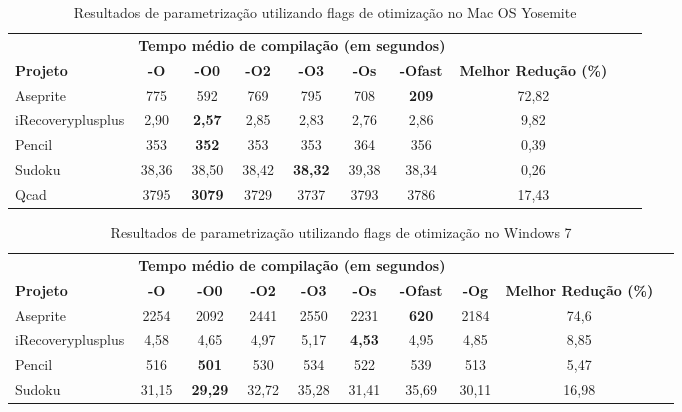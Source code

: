 \begin{table}[!ht]
\tiny
\centering
\caption{Resultados de parametrização utilizando flags de otimização no Mac OS Yosemite}
\label{tab:flags_otimizacao:mac_os}
\begin{tabular}{lccccccccc}
& \multicolumn{6}{c}{\textbf{Tempo médio de compilação (em segundos)} } \\
 \textbf{Projeto}& \textbf{-O}  & \textbf{-O0}   & \textbf{-O2} & \textbf{-O3} & \textbf{-Os} & \textbf{-Ofast} & \textbf{Melhor Redução (\%)}\\ \toprule
Aseprite & 775 &  592 &  769 & 795 & 708 & \textbf{209}  & 72,82 \\ 
iRecoveryplusplus & 2,90 & \textbf{2,57} & 2,85 & 2,83 &  2,76  & 2,86  & 9,82 \\ 
Pencil & 353 & \textbf{352} & 353  & 353  & 364 & 356 &  0,39 \\ 
Sudoku & 38,36 & 38,50 & 38,42 & \textbf{38,32} & 39,38 & 38,34 & 0,26  \\ 
Qcad   & 3795 & \textbf{3079} & 3729  & 3737 & 3793  & 3786 &  17,43  \\ 
\end{tabular}
\end{table}

\begin{table}[!ht]
\tiny
\centering
\caption{Resultados de parametrização utilizando flags de otimização no Windows 7}
\label{tab:flags_otimizacao:windows}
\begin{tabular}{lccccccccc}
& \multicolumn{6}{c}{\textbf{Tempo médio de compilação (em segundos)} } \\
 \textbf{Projeto}& \textbf{-O}  & \textbf{-O0}   & \textbf{-O2} & \textbf{-O3} & \textbf{-Os} & \textbf{-Ofast} & \textbf{-Og} & \textbf{Melhor Redução (\%)}\\ \toprule
Aseprite &  2254 & 2092 & 2441 & 2550 & 2231 & \textbf{620} & 2184 & 74,6  \\ 
iRecoveryplusplus & 4,58 & 4,65 & 4,97 & 5,17 & \textbf{4,53} & 4,95 &  4,85 &  8,85 \\ 
Pencil & 516 & \textbf{501} & 530  & 534  & 522 & 539 & 513 & 5,47 \\ 
Sudoku & 31,15 & \textbf{29,29} & 32,72 & 35,28 & 31,41 & 35,69 & 30,11 & 16,98 \\ 
\end{tabular}
\end{table}

